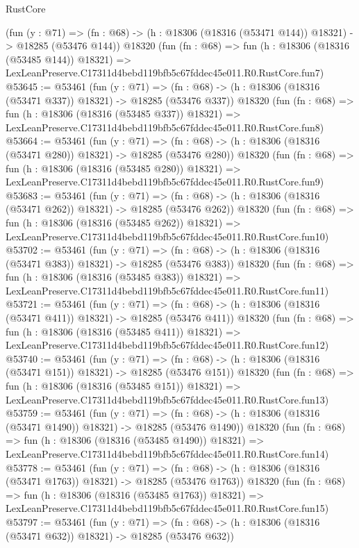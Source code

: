 \begin{lexlean}{RustCore}
\begin{coremodule}
    (fun (y : @71) =>
    (fn : @68) -> (h : @18306 (@18316 (@53471 @144)) @18321) -> @18285 (@53476 @144))
    @18320
    (fun (fn : @68) =>
    fun (h : @18306 (@18316 (@53485 @144)) @18321) =>
    LexLeanPreserve.C17311d4bebd119bfb5c67fddec45e011.R0.RustCore.fun7)
@53645 := @53461
    (fun (y : @71) =>
    (fn : @68) -> (h : @18306 (@18316 (@53471 @337)) @18321) -> @18285 (@53476 @337))
    @18320
    (fun (fn : @68) =>
    fun (h : @18306 (@18316 (@53485 @337)) @18321) =>
    LexLeanPreserve.C17311d4bebd119bfb5c67fddec45e011.R0.RustCore.fun8)
@53664 := @53461
    (fun (y : @71) =>
    (fn : @68) -> (h : @18306 (@18316 (@53471 @280)) @18321) -> @18285 (@53476 @280))
    @18320
    (fun (fn : @68) =>
    fun (h : @18306 (@18316 (@53485 @280)) @18321) =>
    LexLeanPreserve.C17311d4bebd119bfb5c67fddec45e011.R0.RustCore.fun9)
@53683 := @53461
    (fun (y : @71) =>
    (fn : @68) -> (h : @18306 (@18316 (@53471 @262)) @18321) -> @18285 (@53476 @262))
    @18320
    (fun (fn : @68) =>
    fun (h : @18306 (@18316 (@53485 @262)) @18321) =>
    LexLeanPreserve.C17311d4bebd119bfb5c67fddec45e011.R0.RustCore.fun10)
@53702 := @53461
    (fun (y : @71) =>
    (fn : @68) -> (h : @18306 (@18316 (@53471 @383)) @18321) -> @18285 (@53476 @383))
    @18320
    (fun (fn : @68) =>
    fun (h : @18306 (@18316 (@53485 @383)) @18321) =>
    LexLeanPreserve.C17311d4bebd119bfb5c67fddec45e011.R0.RustCore.fun11)
@53721 := @53461
    (fun (y : @71) =>
    (fn : @68) -> (h : @18306 (@18316 (@53471 @411)) @18321) -> @18285 (@53476 @411))
    @18320
    (fun (fn : @68) =>
    fun (h : @18306 (@18316 (@53485 @411)) @18321) =>
    LexLeanPreserve.C17311d4bebd119bfb5c67fddec45e011.R0.RustCore.fun12)
@53740 := @53461
    (fun (y : @71) =>
    (fn : @68) -> (h : @18306 (@18316 (@53471 @151)) @18321) -> @18285 (@53476 @151))
    @18320
    (fun (fn : @68) =>
    fun (h : @18306 (@18316 (@53485 @151)) @18321) =>
    LexLeanPreserve.C17311d4bebd119bfb5c67fddec45e011.R0.RustCore.fun13)
@53759 := @53461
    (fun (y : @71) =>
    (fn : @68) -> (h : @18306 (@18316 (@53471 @1490)) @18321) -> @18285 (@53476 @1490))
    @18320
    (fun (fn : @68) =>
    fun (h : @18306 (@18316 (@53485 @1490)) @18321) =>
    LexLeanPreserve.C17311d4bebd119bfb5c67fddec45e011.R0.RustCore.fun14)
@53778 := @53461
    (fun (y : @71) =>
    (fn : @68) -> (h : @18306 (@18316 (@53471 @1763)) @18321) -> @18285 (@53476 @1763))
    @18320
    (fun (fn : @68) =>
    fun (h : @18306 (@18316 (@53485 @1763)) @18321) =>
    LexLeanPreserve.C17311d4bebd119bfb5c67fddec45e011.R0.RustCore.fun15)
@53797 := @53461
    (fun (y : @71) =>
    (fn : @68) -> (h : @18306 (@18316 (@53471 @632)) @18321) -> @18285 (@53476 @632))

\end{coremodule}
\end{lexlean}

